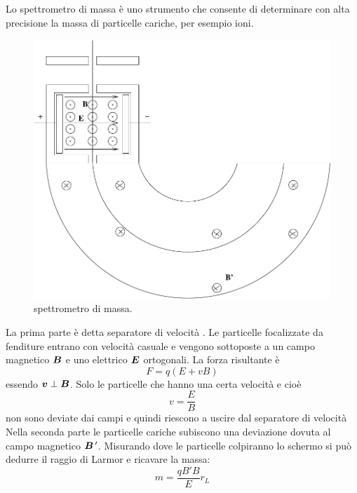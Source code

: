 \begin{Es}\label{spettrometro01}
  Lo spettrometro di massa è uno strumento che consente di determinare con alta precisione la massa di particelle cariche, per esempio ioni.
  \begin{figure}[htbp]
    \centering
    \includegraphics[scale=0.5]{immagini/fisica2/spettrometro}
    \caption{spettrometro di massa.}
  \end{figure}
  La prima parte è detta separatore di velocità . Le particelle focalizzate da fenditure entrano con velocità casuale e vengono sottoposte a un campo magnetico $\boldsymbol{B}$ e uno elettrico $\boldsymbol{E}$ ortogonali. La forza risultante è
  \[F=q(E+vB)\]
  essendo $\boldsymbol{v}\perp\boldsymbol{B}$. Solo le particelle che hanno una certa velocità e cioè
  \[v=\frac{E}{B}\]
  non sono deviate dai campi e quindi riescono a uscire dal separatore di velocità  Nella seconda parte le particelle cariche subiscono una deviazione dovuta al campo magnetico $\boldsymbol{B}\,'$. Misurando dove le particelle colpiranno lo schermo si può dedurre il raggio di Larmor e ricavare la massa:
  \[m=\frac{qB'B}{E}r_L\]
\end{Es}

